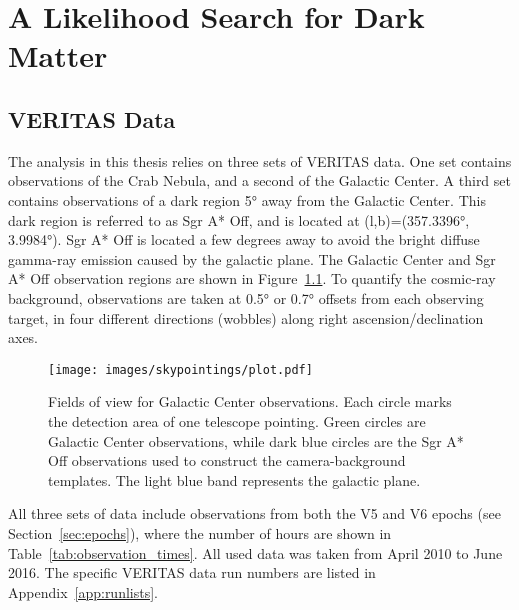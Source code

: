 \cleartooddpage[\thispagestyle{empty}]
\newcommand{\Like}{L}
\newcommand{\LogLike}{\mathcal{L}}
\newcommand{\LogLikeMax}{\LogLike_{\textrm{max}}}
\newcommand{\xtrue}{x}
\newcommand{\xdet }{x'}
\newcommand{\ltrue}{l}
\newcommand{\ldet }{l'}
\newcommand{\btrue}{b}
\newcommand{\bdet }{b'}
\newcommand{\Etrue}{E}
\newcommand{\Edet }{E'}
\newcommand{\ttrue}{t}
\newcommand{\tdet }{t'}
\newcommand{\Aeff }{A_\textrm{eff }}
\newcommand{\Edisp}{E_\textrm{disp}}
\newcommand{\Mnull}{M_\textrm{null}}
\newcommand{\Malt }{M_\textrm{alt}}

\chapter{A Likelihood Search for Dark Matter}\label{chapter:analysis}

\section{VERITAS Data}\label{veritasdata}
The analysis in this thesis relies on three sets of VERITAS data.
One set contains observations of the Crab Nebula, and a second of the Galactic Center.
A third set contains observations of a dark region \nicetilde\ang{5} away from the Galactic Center.
This dark region is referred to as  Sgr A* Off, and is located at (l,b)=(\ang{357.3396}, \ang{3.9984}).
Sgr A* Off is located a few degrees away to avoid the bright diffuse gamma-ray emission caused by the galactic plane.
The Galactic Center and Sgr A* Off observation regions are shown in Figure~\ref{fig:gcfieldsofview}.
To quantify the cosmic-ray background, observations are taken at \ang{0.5} or \ang{0.7} offsets from each observing target, in four different directions (wobbles) along right ascension/declination axes.

\begin{figure}[!ht]
  \centering
  \texttt{[image: images/skypointings/plot.pdf]}
  \caption[VERITAS Galactic Center Pointings]{
    Fields of view for Galactic Center observations.
    Each circle marks the detection area of one telescope pointing.
    Green circles are Galactic Center observations, while dark blue circles are the Sgr A* Off observations used to construct the camera-background templates.
    The light blue band represents the galactic plane.
  }
  \label{fig:gcfieldsofview}
\end{figure}

All three sets of data include observations from both the V5 and V6 epochs (see Section~\ref{sec:epochs}), where the number of hours are shown in Table~\ref{tab:observation_times}.
All used data was taken from April 2010 to June 2016.
The specific VERITAS data run numbers are listed in Appendix~\ref{app:runlists}.

